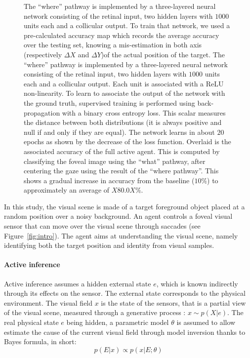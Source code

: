 \begin{figure}[t!]
{\ICANN
\C The ``where'' pathway is implemented by a three-layered neural network consisting of the retinal input, two hidden layers with $1000$ units each and a collicular output. To train that network, we used a pre-calculated accuracy map which records the average accuracy over the testing set, knowing a mis-estimation in both axis \ICANN
\else (respectively $\Delta X$ and  $\Delta Y$)\fi of the actual position of the target. %
\else
\C The ``where'' pathway is implemented by a three-layered neural network consisting of the retinal input, two hidden layers with $1000$ units each and a collicular output. Each unit is associated with a ReLU non-linearity. To learn to associate the output of the network with the ground truth, supervised training is performed using back-propagation with a binary cross entropy loss. This scalar measures the distance between both distributions (it is always positive and null if and only if they are equal). The network learns in about $20$ epochs as shown by the decrease of the loss function. Overlaid is the associated accuracy of the full active agent. This is computed by classifying the foveal image using the ``what'' pathway, after centering the gaze using the result of the ``where pathway''. This shows a gradual increase in accuracy from the baseline ($10\%$) to approximately an average of $X80.0X\%$. %
\fi
		\label{fig:methods}}%
\end{figure}%
In this study, the visual scene is made of a target foreground object placed at a random position over a noisy background. An agent controls a foveal visual sensor that can move over the visual scene through saccades (see Figure~\ref{fig:intro}). 
The agent aims at understanding the visual scene, namely identifying both the target position and identity from visual samples.

\paragraph{Active inference}
Active inference assumes a hidden external state $e$, which is known indirectly through its effects on the sensor. The external state  corresponds to the physical environment. The visual field $x$ is the state of the sensors, that is a partial view of the visual scene, measured through a generative process : $x\sim p(X|e)$. The real physical state $e$ being hidden, a parametric model $\theta$ is assumed to allow estimate the cause of the current visual field through model inversion thanks to Bayes formula, in short:
$$p(E|x) \propto p(x|E;\theta)$$



